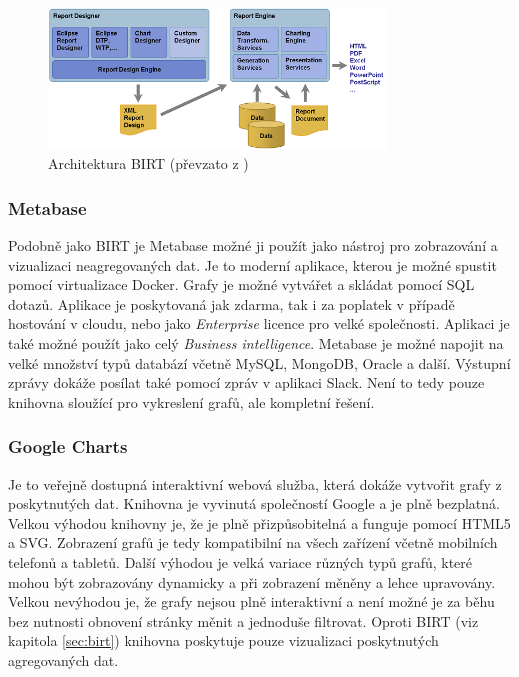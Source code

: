 \documentclass[czech,master,public,dept460,male,cpdeclaration,oneside]{diploma}
\begin{document}
\begin{figure}[!ht]
    \centering
    \includegraphics[width=0.8\textwidth]{Diplomka/Figures/birtarch.png}
    \caption{Architektura BIRT (převzato z \cite{ref:birt_about})}
    \label{fig:birtarch}
\end{figure}
\subsubsection{Metabase}
Podobně jako BIRT je Metabase možné ji použít jako nástroj pro zobrazování a vizualizaci neagregovaných dat. Je to moderní aplikace, kterou je možné spustit pomocí virtualizace Docker. Grafy je možné vytvářet a skládat pomocí SQL dotazů. Aplikace je poskytovaná jak zdarma, tak i za poplatek v případě hostování v cloudu, nebo jako \textit{Enterprise} licence pro velké společnosti. Aplikaci je také možné použít jako celý \textit{Business intelligence}. Metabase je možné napojit na velké množství typů databází včetně MySQL, MongoDB, Oracle a další. Výstupní zprávy dokáže posílat také pomocí zpráv v aplikaci Slack. Není to tedy pouze knihovna sloužící pro vykreslení grafů, ale kompletní řešení. \cite{ref:metabase}


\subsubsection{Google Charts}
\label{sec:google_charts}
Je to veřejně dostupná interaktivní webová služba, která dokáže vytvořit grafy z poskytnutých dat. Knihovna je vyvinutá společností Google a je plně bezplatná. Velkou výhodou knihovny je, že je plně přizpůsobitelná a funguje pomocí HTML5 a SVG. Zobrazení grafů je tedy kompatibilní na všech zařízení včetně mobilních telefonů a tabletů. Další výhodou je velká variace různých typů grafů, které mohou být zobrazovány dynamicky a při zobrazení měněny a lehce upravovány. Velkou nevýhodou je, že grafy nejsou plně interaktivní a není možné je za běhu bez nutnosti obnovení stránky měnit a jednoduše filtrovat. Oproti BIRT (viz kapitola \ref{sec:birt}) knihovna poskytuje pouze vizualizaci poskytnutých agregovaných dat.
\end{document}
